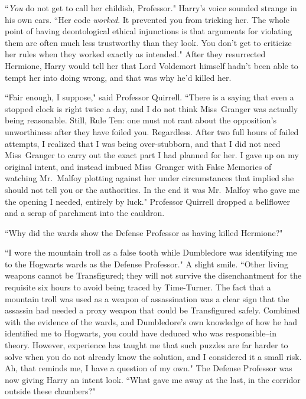 ``\emph{You} do not get to call her childish, Professor." Harry's voice sounded strange in his own ears. ``Her code \emph{worked}. It prevented you from tricking her. The whole point of having deontological ethical injunctions is that arguments for violating them are often much less trustworthy than they look. You don't get to criticize her rules when they worked exactly as intended." After they resurrected Hermione, Harry would tell her that Lord Voldemort himself hadn't been able to tempt her into doing wrong, and that was why he'd killed her.

``Fair enough, I suppose," said Professor Quirrell. ``There is a saying that even a stopped clock is right twice a day, and I do not think Miss~Granger was actually being reasonable. Still, Rule Ten: one must not rant about the opposition's unworthiness after they have foiled you. Regardless. After two full hours of failed attempts, I realized that I was being over-stubborn, and that I did not need Miss~Granger to carry out the exact part I had planned for her. I gave up on my original intent, and instead imbued Miss~Granger with False Memories of watching Mr.~Malfoy plotting against her under circumstances that implied she should not tell you or the authorities. In the end it was Mr.~Malfoy who gave me the opening I needed, entirely by luck." Professor Quirrell dropped a bellflower and a scrap of parchment into the cauldron.

``Why did the wards show the Defense Professor as having killed Hermione?"

``I wore the mountain troll as a false tooth while Dumbledore was identifying me to the Hogwarts wards as the Defense Professor." A slight smile. ``Other living weapons cannot be Transfigured; they will not survive the disenchantment for the requisite six hours to avoid being traced by Time-Turner. The fact that a mountain troll was used as a weapon of assassination was a clear sign that the assassin had needed a proxy weapon that could be Transfigured safely. Combined with the evidence of the wards, and Dumbledore's own knowledge of how he had identified me to Hogwarts, you could have deduced who was responsible\---in theory. However, experience has taught me that such puzzles are far harder to solve when you do not already know the solution, and I considered it a small risk. Ah, that reminds me, I have a question of my own." The Defense Professor was now giving Harry an intent look. ``What gave me away at the last, in the corridor outside these chambers?"

